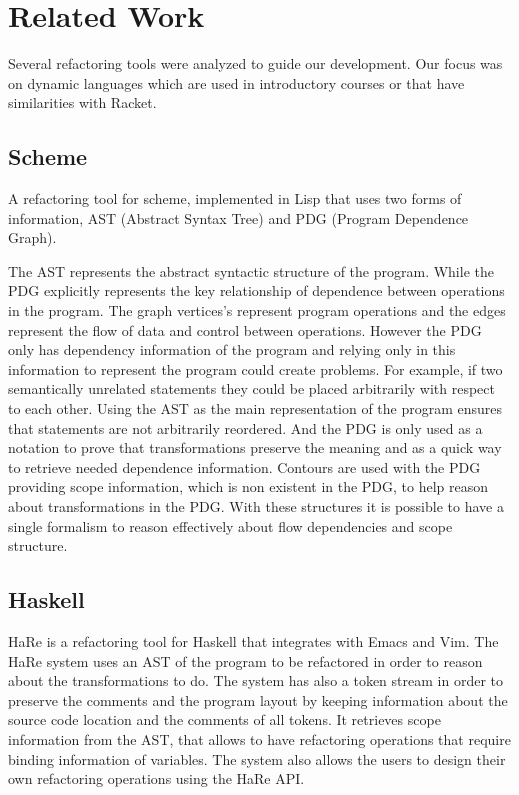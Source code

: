 \section{Related Work}
\label{sec:Related-Work}
Several refactoring tools were analyzed to guide our development.
Our focus was on dynamic languages which are used in introductory courses or that have similarities
with Racket.

\subsection{Scheme}
A refactoring tool \cite{griswold1991program} for scheme, implemented in Lisp that
uses two forms of information, AST (Abstract Syntax Tree) and PDG (Program Dependence Graph).

The AST represents the abstract syntactic structure of the program.
While the PDG explicitly represents the key relationship of dependence between
operations in the program. %
The graph vertices's represent program operations and the edges represent the flow of
data and control between operations.
However the PDG only has dependency information of the program and relying only 
in this information to represent the program could create problems.
For example, if two semantically unrelated statements they could be placed arbitrarily with
respect to each other.
Using the AST as the main representation of the program ensures that statements
are not arbitrarily reordered.
And the PDG is only used as a notation to prove that transformations preserve
the meaning and as a quick way to retrieve needed dependence information.
Contours are used with the PDG providing scope information, which is non existent in the PDG,
to help reason about transformations in the PDG.
With these structures it is possible to have a single formalism to reason effectively
about flow dependencies and scope structure.
\subsection{Haskell}
HaRe \cite{thompson2005refactoring} is a refactoring tool for Haskell that
integrates with Emacs and Vim.
The HaRe system uses an AST of the program to be
refactored in order to reason about the transformations to do.
The system has also a token stream in order to preserve the comments and the
program layout by keeping information about the source code location and the comments of all tokens.
It retrieves scope information from the AST, that allows to have refactoring operations that
require binding information of variables. %
The system also allows the users to design their own refactoring operations
using the HaRe API.
